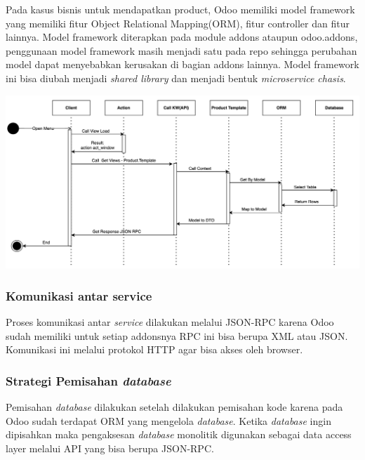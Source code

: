 Pada kasus bisnis untuk mendapatkan product, Odoo memiliki model framework yang memiliki fitur Object Relational Mapping(ORM), fitur controller dan fitur lainnya. Model framework diterapkan pada module addons ataupun odoo.addons, penggunaan model framework masih menjadi satu pada repo sehingga perubahan model dapat menyebabkan kerusakan di bagian addons lainnya. Model framework ini bisa diubah menjadi \textit{shared library} dan menjadi bentuk \textit{microservice chasis}.\\

\begin{center}
	\includegraphics[width=14cm]{img/bab_3/seqDiagGet.png}
	\label{fig:asd}
\end{center}

\subsubsection{Komunikasi antar service}
Proses komunikasi antar \textit{service} dilakukan melalui JSON-RPC karena Odoo sudah memiliki untuk setiap addonsnya RPC ini bisa berupa XML atau JSON. Komunikasi ini melalui protokol  HTTP agar bisa akses oleh browser.  
\\
\subsubsection{Strategi Pemisahan \textit{database}}
Pemisahan \textit{database} dilakukan setelah dilakukan pemisahan kode karena pada Odoo sudah terdapat ORM yang mengelola \textit{database}. Ketika \textit{database} ingin dipisahkan maka pengaksesan \textit{database} monolitik  digunakan sebagai data access layer melalui API yang bisa berupa JSON-RPC.
\\ 

